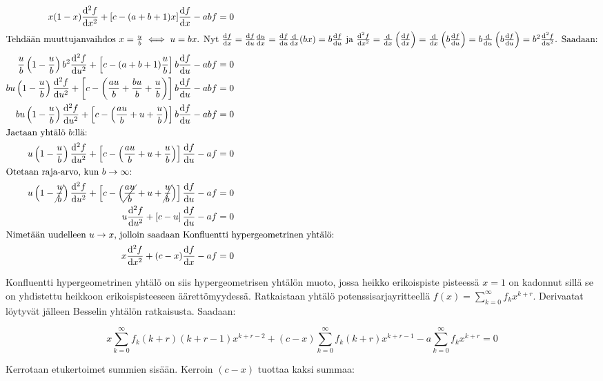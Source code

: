 \documentclass[../johdoksia.tex]{subfiles}
\begin{document}
	\begin{align*}
		x(1 - x)\odv{^2f}{x^2} + [c - (a + b + 1)x]\odv{f}{x} - abf &= 0 \\
		\intertext{Tehdään muuttujanvaihdos $x = \frac{u}{b} \iff u = bx$. Nyt $\odv{f}{x} = \odv{f}{u}\odv{u}{x} = \odv{f}{u}\odv{}{x}(bx) = b\odv{f}{u}$ ja $\odv{^2f}{x^2} = \odv{}{x}\left(\odv{f}{x}\right) = \odv{}{x}\left(b\odv{f}{u}\right) = b\odv{}{u}\left(b\odv{f}{u}\right) = b^2\odv{^2f}{u^2}$. Saadaan:}
		\frac{u}{b}\left(1 - \frac{u}{b}\right)b^2\odv{^2f}{u^2} + \left[c - (a + b + 1)\frac{u}{b}\right]b\odv{f}{u} - abf &= 0 \\
		bu\left(1 - \frac{u}{b}\right)\odv{^2f}{u^2} + \left[c - \left(\frac{au}{b} + \frac{bu}{b} + \frac{u}{b}\right)\right]b\odv{f}{u} - abf &= 0 \\
		bu\left(1 - \frac{u}{b}\right)\odv{^2f}{u^2} + \left[c - \left(\frac{au}{b} + u + \frac{u}{b}\right)\right]b\odv{f}{u} - abf &= 0 \\
		\intertext{Jaetaan yhtälö $b$:llä:}
		u\left(1 - \frac{u}{b}\right)\odv{^2f}{u^2} + \left[c - \left(\frac{au}{b} + u + \frac{u}{b}\right)\right]\odv{f}{u} - af &= 0 \\
		\intertext{Otetaan raja-arvo, kun $b\to\infty$:}
		u\left(1 - \cancel{\frac{u}{b}}\right)\odv{^2f}{u^2} + \left[c - \left(\cancel{\frac{au}{b}} + u + \cancel{\frac{u}{b}}\right)\right]\odv{f}{u} - af &= 0 \\
		u\odv{^2f}{u^2} + \left[c - u\right]\odv{f}{u} - af &= 0 \\
		\intertext{Nimetään uudelleen $u \to x$, jolloin saadaan Konfluentti hypergeometrinen yhtälö:}
		x\odv{^2f}{x^2} + (c - x)\odv{f}{x} - af &= 0 \\
	\end{align*}
	
	\noindent Konfluentti hypergeometrinen yhtälö on siis hypergeometrisen yhtälön muoto, jossa heikko erikoispiste pisteessä $x = 1$ on kadonnut sillä se on yhdistettu heikkoon erikoispisteeseen äärettömyydessä. Ratkaistaan yhtälö potenssisarjayritteellä $f(x) = \sum_{k = 0}^{\infty}f_kx^{k + r}$. Derivaatat löytyvät jälleen Besselin yhtälön ratkaisusta. Saadaan:
	
	\begin{equation*}
		x\sum_{k = 0}^{\infty}f_k(k + r)(k + r - 1)x^{k + r - 2} + (c - x)\sum_{k = 0}^{\infty}f_k(k + r)x^{k + r - 1} - a\sum_{k = 0}^{\infty}f_kx^{k + r} = 0
	\end{equation*}

	\noindent Kerrotaan etukertoimet summien sisään. Kerroin $(c - x)$ tuottaa kaksi summaa:
	
\end{document}
